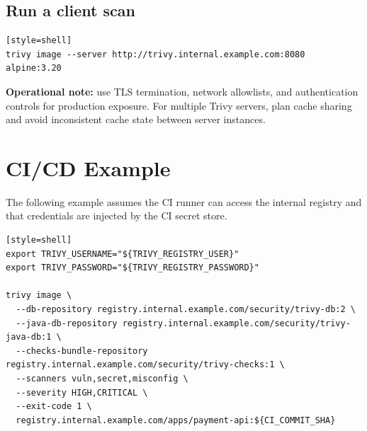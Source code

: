 \documentclass[10pt]{article}
\begin{document}
\subsection{Run a client scan}
\begin{verbatim}[style=shell]
trivy image --server http://trivy.internal.example.com:8080 alpine:3.20
\end{verbatim}

\textbf{Operational note:} use TLS termination, network allowlists, and authentication controls for production exposure. For multiple Trivy servers, plan cache sharing and avoid inconsistent cache state between server instances.

\section{CI/CD Example}
The following example assumes the CI runner can access the internal registry and that credentials are injected by the CI secret store.

\begin{verbatim}[style=shell]
export TRIVY_USERNAME="${TRIVY_REGISTRY_USER}"
export TRIVY_PASSWORD="${TRIVY_REGISTRY_PASSWORD}"

trivy image \
  --db-repository registry.internal.example.com/security/trivy-db:2 \
  --java-db-repository registry.internal.example.com/security/trivy-java-db:1 \
  --checks-bundle-repository registry.internal.example.com/security/trivy-checks:1 \
  --scanners vuln,secret,misconfig \
  --severity HIGH,CRITICAL \
  --exit-code 1 \
  registry.internal.example.com/apps/payment-api:${CI_COMMIT_SHA}
\end{verbatim}
\end{document}

